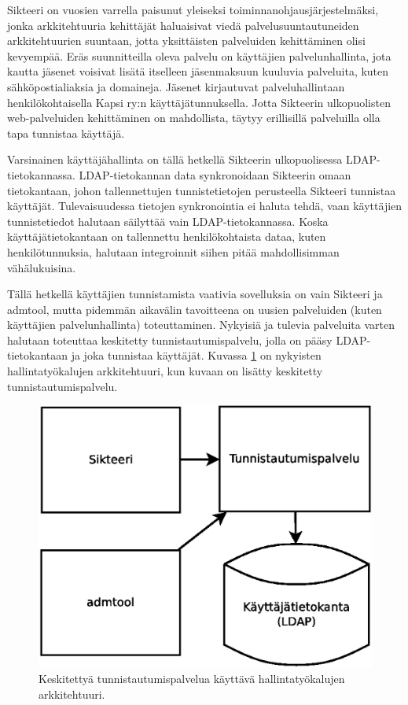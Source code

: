 Sikteeri on vuosien varrella paisunut yleiseksi toiminnanohjausjärjestelmäksi, jonka arkkitehtuuria kehittäjät haluaisivat viedä palvelusuuntautuneiden arkkitehtuurien suuntaan, jotta yksittäisten palveluiden kehittäminen olisi kevyempää. Eräs suunnitteilla oleva palvelu on käyttäjien palvelunhallinta, jota kautta jäsenet voisivat lisätä itselleen jäsenmaksuun kuuluvia palveluita, kuten sähköpostialiaksia ja domaineja. Jäsenet kirjautuvat palveluhallintaan henkilökohtaisella Kapsi ry:n käyttäjätunnuksella. Jotta Sikteerin ulkopuolisten web-palveluiden kehittäminen on mahdollista, täytyy erillisillä palveluilla olla tapa tunnistaa käyttäjä.

Varsinainen käyttäjähallinta on tällä hetkellä Sikteerin ulkopuolisessa LDAP-tie\-to\-kan\-nas\-sa. LDAP-tietokannan data synkronoidaan Sikteerin omaan tietokantaan, johon tallennettujen tunnistetietojen perusteella Sikteeri tunnistaa käyttäjät. Tulevaisuudessa tietojen synkronointia ei haluta tehdä, vaan käyttäjien tunnistetiedot halutaan säilyttää vain LDAP-tietokannassa. Koska käyttäjätietokantaan on tallennettu henkilökohtaista dataa, kuten henkilötunnuksia, halutaan integroinnit siihen pitää mahdollisimman vähälukuisina.

Tällä hetkellä käyttäjien tunnistamista vaativia sovelluksia on vain Sikteeri ja admtool, mutta pidemmän aikavälin tavoitteena on uusien palveluiden (kuten käyttäjien palvelunhallinta) toteuttaminen. Nykyisiä ja tulevia palveluita varten halutaan toteuttaa keskitetty tunnistautumispalvelu, jolla on pääsy LDAP-tietokantaan ja joka tunnistaa käyttäjät. Kuvassa \ref{kapsi_nykyinen_uusi} on nykyisten hallintatyökalujen arkkitehtuuri, kun kuvaan on lisätty keskitetty tunnistautumispalvelu.

\begin{figure}[ht]
\centering
\includegraphics[width=.6\textwidth]{toteutus/muutostarve/kapsi_uusi.eps}
\caption{Keskitettyä tunnistautumispalvelua käyttävä hallintatyökalujen arkkitehtuuri.}%
\label{kapsi_nykyinen_uusi}
\end{figure}

